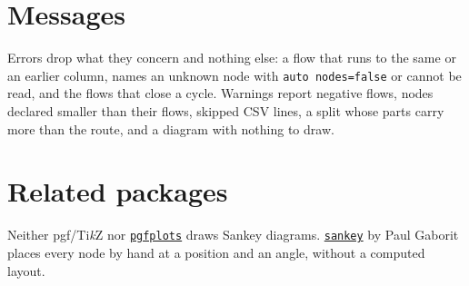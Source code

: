 \documentclass[10pt,parskip=half,english,numbers=noenddot,footnotes=nomultiple,oneside]{scrartcl}
\let\T\texttt
\newcommand\sklink[2]{\href{#1}{\textcolor{Teal!70!black}{#2}}}
\begin{document}
\section{Messages}
Errors drop what they concern and nothing else: a flow that runs to the same or an earlier column, names an unknown node with \T{auto nodes=false} or cannot be read, and the flows that close a cycle. Warnings report negative flows, nodes declared smaller than their flows, skipped CSV lines, a split whose parts carry more than the route, and a diagram with nothing to draw.

\section{Related packages}
Neither pgf/Ti\emph{k}Z nor \sklink{https://ctan.org/pkg/pgfplots}{\T{pgfplots}} draws Sankey diagrams. \sklink{https://ctan.org/pkg/sankey}{\T{sankey}} by Paul Gaborit places every node by hand at a position and an angle, without a computed layout.

\printindex[\jobname]
\end{document}

